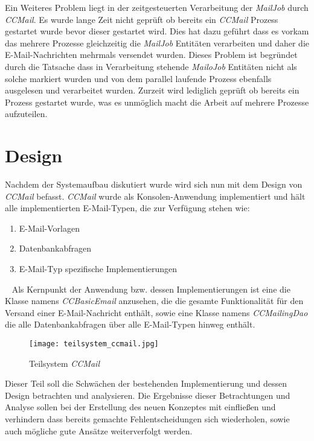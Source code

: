 \newline
\newline
Ein Weiteres Problem liegt in der zeitgesteuerten Verarbeitung der \emph{MailJob} durch \emph{CCMail}. Es wurde lange Zeit nicht geprüft ob bereits ein \emph{CCMail} Prozess gestartet wurde bevor dieser gestartet wird. Dies hat dazu geführt dass es vorkam das mehrere Prozesse gleichzeitig die \emph{MailJob} Entitäten verarbeiten und daher die E-Mail-Nachrichten mehrmals versendet wurden. Dieses Problem ist begründet durch die Tatsache dass in Verarbeitung stehende \emph{MailoJob} Entitäten nicht als solche markiert wurden und von dem parallel laufende Prozess ebenfalls ausgelesen und verarbeitet wurden. Zurzeit wird lediglich geprüft ob bereits ein Prozess gestartet wurde, was es unmöglich macht die Arbeit auf mehrere Prozesse aufzuteilen.
\newpage
\section{Design}
\label{sec:ccmail-design}
Nachdem der Systemaufbau diskutiert wurde wird sich nun mit dem Design von \emph{CCMail} befasst. \emph{CCMail} wurde als Konsolen-Anwendung implementiert und hält alle implementierten E-Mail-Typen, die zur Verfügung stehen wie:
\begin{enumerate}
	\item E-Mail-Vorlagen
	\item Datenbankabfragen
	\item E-Mail-Typ spezifische Implementierungen
\end{enumerate}
\ \newline
Als Kernpunkt der Anwendung bzw. dessen Implementierungen ist eine die Klasse namens \emph{CCBasicEmail} anzusehen, die die gesamte Funktionalität für den Versand einer E-Mail-Nachricht enthält, sowie eine Klasse namens \emph{CCMailingDao} die alle Datenbankabfragen über alle E-Mail-Typen hinweg enthält.
\begin{figure}[h]
\centering
\texttt{[image: teilsystem\_ccmail.jpg]} 
\caption{Teilsystem \emph{CCMail}}
\label{fig:ccmail-teilsystem}
\end{figure}
Dieser Teil soll die Schwächen der bestehenden Implementierung und dessen Design betrachten und analysieren. Die Ergebnisse dieser Betrachtungen und Analyse sollen bei der Erstellung des neuen Konzeptes mit einfließen und verhindern dass bereits gemachte Fehlentscheidungen sich wiederholen, sowie auch mögliche gute Ansätze weiterverfolgt werden.
\newline
